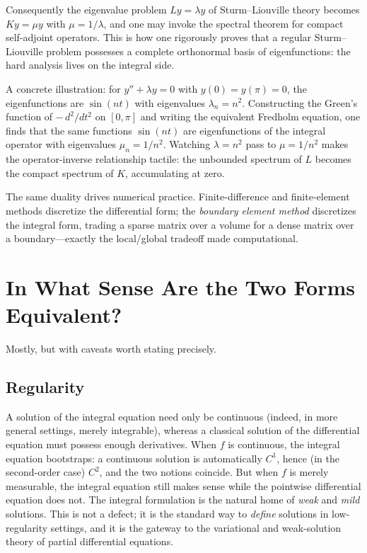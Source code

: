 \documentclass{essay}
\begin{document}
Consequently the eigenvalue problem $Ly = \lambda y$ of Sturm--Liouville theory becomes $Ky = \mu y$ with $\mu = 1/\lambda$, and one may invoke the spectral theorem for compact self-adjoint operators. This is how one rigorously proves that a regular Sturm--Liouville problem possesses a complete orthonormal basis of eigenfunctions: the hard analysis lives on the integral side.

A concrete illustration: for $y'' + \lambda y = 0$ with $y(0) = y(\pi) = 0$, the eigenfunctions are $\sin(nt)$ with eigenvalues $\lambda_n = n^2$. Constructing the Green's function of $-\,d^2/dt^2$ on $[0, \pi]$ and writing the equivalent Fredholm equation, one finds that the same functions $\sin(nt)$ are eigenfunctions of the integral operator with eigenvalues $\mu_n = 1/n^2$. Watching $\lambda = n^2$ pass to $\mu = 1/n^2$ makes the operator-inverse relationship tactile: the unbounded spectrum of $L$ becomes the compact spectrum of $K$, accumulating at zero.

The same duality drives numerical practice. Finite-difference and finite-element methods discretize the differential form; the \emph{boundary element method} discretizes the integral form, trading a sparse matrix over a volume for a dense matrix over a boundary---exactly the local/global tradeoff made computational.

\section{In What Sense Are the Two Forms Equivalent?}
\label{sec:equivalence}

Mostly, but with caveats worth stating precisely.

\subsection{Regularity}

A solution of the integral equation need only be continuous (indeed, in more general settings, merely integrable), whereas a classical solution of the differential equation must possess enough derivatives. When $f$ is continuous, the integral equation bootstraps: a continuous solution is automatically $C^1$, hence (in the second-order case) $C^2$, and the two notions coincide. But when $f$ is merely measurable, the integral equation still makes sense while the pointwise differential equation does not. The integral formulation is the natural home of \emph{weak} and \emph{mild} solutions. This is not a defect; it is the standard way to \emph{define} solutions in low-regularity settings, and it is the gateway to the variational and weak-solution theory of partial differential equations.
\end{document}
